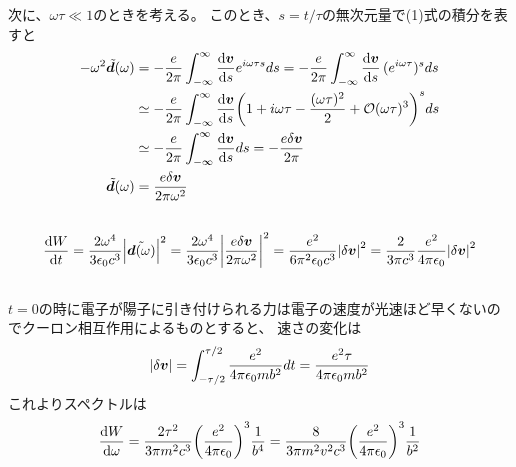 \documentclass[../../sp_2017.tex]{subfiles}
\begin{document}
次に、\(\omega\tau \ll 1\)のときを考える。
このとき、\(s = t/\tau\)の無次元量で(1)式の積分を表すと
\begin{equation}\begin{aligned}[b]
    -\omega^2\tilde{\vb*{d}}(\omega)
        &= -\frac{e}{2\pi}\int_{-\infty}^\infty\dv{\vb*{v}}{s}e^{i\omega\tau s}ds
        = -\frac{e}{2\pi}\int_{-\infty}^\infty\dv{\vb*{v}}{s}\,(e^{i\omega\tau})^sds\\
        &\simeq -\frac{e}{2\pi}\int_{-\infty}^\infty\dv{\vb*{v}}{s}\qty(1+i\omega \tau -\frac{(\omega \tau)^2}{2}+\mathcal{O}(\omega\tau)^3)^sds\\
        &\simeq -\frac{e}{2\pi}\int_{-\infty}^\infty\dv{\vb*{v}}{s}ds
        =-\frac{e\delta \vb*{v}}{2\pi}\\
    \tilde{\vb*{d}}(\omega)
     &= \frac{e \delta\vb*{v}}{2\pi\omega^2}
\end{aligned}\end{equation}

\subsection{}
\begin{equation}\begin{aligned}[b]
    \dv{W}{t}
        = \frac{2\omega^4}{3\epsilon_0c^3}\abs{\tilde{\vb*{d}(\omega)}}^2
        = \frac{2\omega^4}{3\epsilon_0c^3}\abs{\frac{e \delta\vb*{v}}{2\pi\omega^2}}^2
        = \frac{e^2}{6\pi^2 \epsilon_0c^3}\abs{\delta \vb*{v}}^2
        = \frac{2}{3\pi c^3}\frac{e^2}{4\pi\epsilon_0}\abs{\delta \vb*{v}}^2
\end{aligned}\end{equation}

\subsection{}
\(t=0\)の時に電子が陽子に引き付けられる力は電子の速度が光速ほど早くないのでクーロン相互作用によるものとすると、
速さの変化は
\begin{equation}\begin{aligned}[b]
    \abs{\delta \vb*{v}} = \int_{-\tau/2}^{\tau/2} \frac{e^2}{4\pi\epsilon_0 mb^2} dt = \frac{e^2\tau}{4\pi\epsilon_0 mb^2}
\end{aligned}\end{equation}
これよりスペクトルは
\begin{equation}\begin{aligned}[b]
    \dv{W}{\omega}
    = \frac{2\tau^2}{3\pi m^2c^3}\qty(\frac{e^2}{4\pi\epsilon_0})^3\frac{1}{b^4}
    = \frac{8}{3\pi m^2v^2c^3}\qty(\frac{e^2}{4\pi\epsilon_0})^3\frac{1}{b^2}
\end{aligned}\end{equation}
\end{document}
